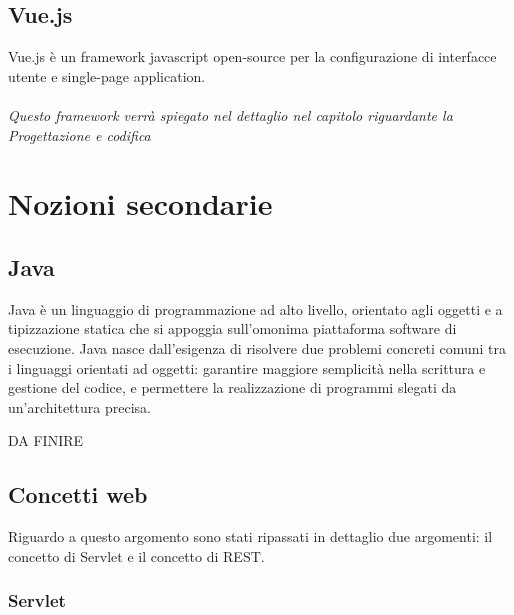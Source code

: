\subsection{Vue.js}

Vue.js è un framework javascript open-source per la configurazione di interfacce utente e single-page application.\\
\\
\textit{Questo framework verrà spiegato nel dettaglio nel capitolo riguardante la Progettazione e codifica}

\section{Nozioni secondarie}

\subsection{Java}

Java è un linguaggio di programmazione ad alto livello, orientato agli oggetti e a tipizzazione statica che si appoggia sull'omonima piattaforma software di esecuzione. Java nasce dall'esigenza di risolvere due problemi concreti comuni tra i linguaggi orientati ad oggetti: garantire maggiore semplicità nella scrittura e gestione del codice, e permettere la realizzazione di programmi slegati da un'architettura precisa. 

 DA FINIRE

\subsection{Concetti web}

Riguardo a questo argomento sono stati ripassati in dettaglio due argomenti: il concetto di Servlet e il concetto di REST.

\subsubsection{Servlet}

